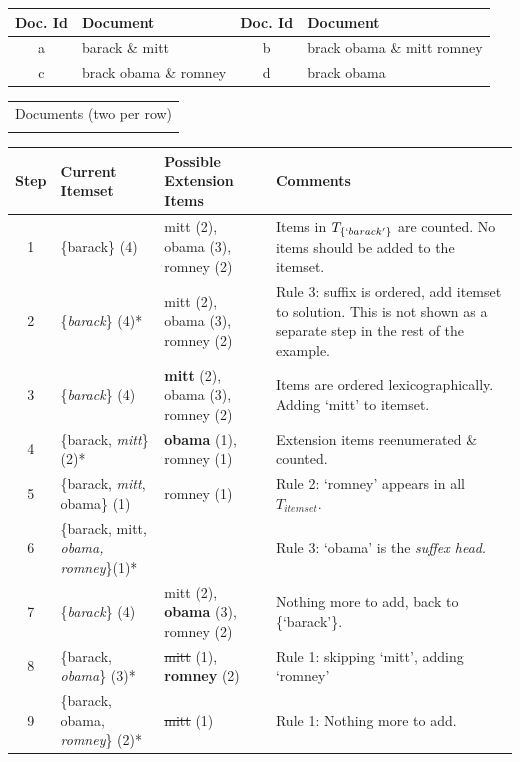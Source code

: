 \documentclass[letterpaper,12pt,titlepage,oneside,final]{book}
\begin{document}
\begin{landscape}
\begin{table}
\centering
\begin{tabular}{|c|p{5cm}||c|p{5cm}|} \hline
Doc. Id & Document & Doc. Id & Document\\\hline
a& barack \& mitt & b & brack obama \& mitt romney  \\\hline
c& brack obama \& romney & d & brack obama  \\\hline
\end{tabular}
\begin{tabular}{c}
Documents (two per row)\\\\
\end{tabular}
\begin{tabular}{|c|p{6.5cm}|p{6.2cm}|p{7.6cm}|} \hline
Step&Current Itemset&Possible Extension Items&Comments\\ \hline
1& \{barack\} (4) & mitt (2), obama (3), romney (2) & Items in $T_{\{`barack'\}}$ are counted. No items should be added to the itemset.  \\ \hline %
2& \{\emph{barack}\} (4)* & mitt (2), obama (3), romney (2) & Rule 3: suffix is ordered, add itemset to solution. This is not shown as a separate step in the rest of the example.\\ \hline
3& \{\emph{barack}\} (4) & \textbf{mitt} (2), obama (3), romney (2) & Items are ordered lexicographically. Adding `mitt' to itemset.\\ \hline
4& \{barack, \emph{mitt}\} (2)* & \textbf{obama} (1), romney (1) & Extension items reenumerated \& counted.\\ \hline
5 & \{barack, \emph{mitt}, obama\} (1) & romney (1)                       & Rule 2: `romney' appears in all $T_{itemset}.$\\\hline
6 & \{barack, mitt, \emph{obama, romney}\}(1)* & & Rule 3: `obama'  is the \emph{suffex head}. \\\hline
7 & \{\emph{barack}\} (4) & mitt (2), \textbf{obama} (3), romney (2) & Nothing more to add, back to \{`barack'\}. \\\hline
8 & \{barack, \emph{obama}\} (3)* & \sout{mitt} (1), \textbf{romney} (2) & Rule 1: skipping `mitt', adding `romney' \\\hline
9 & \{barack, obama, \emph{romney}\} (2)* & \sout{mitt} (1) & Rule 1: Nothing more to add. \\\hline

\end{tabular}
\end{table}
\end{landscape}
\end{document}
